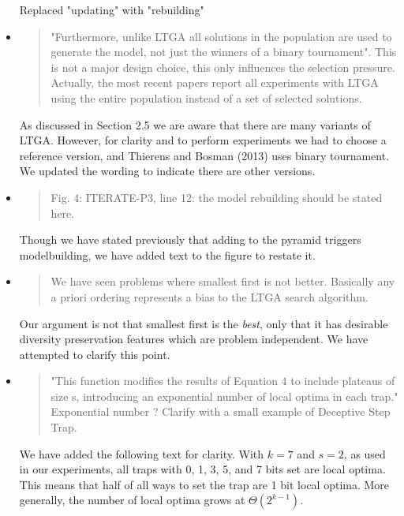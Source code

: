 \documentclass[]{article}
\begin{document}
\begin{itemize}
Replaced "updating" with "rebuilding"

\item
\begin{quote}
"Furthermore, unlike LTGA all solutions in the population are used to generate the model, not just the winners of a binary tournament".
This is not a major design choice, this only influences the selection pressure. Actually, the most recent papers report all experiments with LTGA using the entire population instead of a set of selected solutions.
\end{quote}

As discussed in Section 2.5 we are aware that there are many variants of LTGA. However, for clarity and to perform experiments we had to choose a reference version, and Thierens and Bosman (2013) uses binary tournament. We updated the wording to indicate there are other versions.

\item
\begin{quote}
Fig. 4: ITERATE-P3, line 12: the model rebuilding should be stated here.
\end{quote}

Though we have stated previously that adding to the pyramid triggers modelbuilding, we have added text to the figure to restate it.

\item
\begin{quote}
We have seen problems where smallest first is not better. Basically any a priori ordering represents a bias to the LTGA search algorithm.
\end{quote}

Our argument is not that smallest first is the \textit{best}, only that it has desirable diversity preservation features which are problem independent. We have attempted to clarify this point.

\item
\begin{quote}
 "This function modifies the results of Equation 4 to include plateaus of size s, introducing an exponential number of local optima in each trap."
Exponential number ? Clarify with a small example of Deceptive Step Trap.
\end{quote}

We have added the following text for clarity. 
With $k=7$ and $s=2$, as used in our experiments, all traps with 0, 1, 3, 5, and 7 bits set are local optima.
This means that half of all ways to set the trap are 1 bit local optima.
More generally, the number of local optima grows at $\Theta(2^{k-1})$.


\end{itemize}
\end{document}
